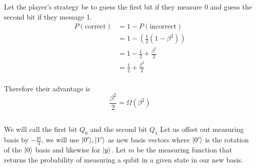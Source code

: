 Let the player's strategy be to guess the first bit if they measure 0 and guess the second bit if they message 1.
\begin{align*}
    P(\text{correct}) &= 1-P(\text{incorrect})\\
        &= 1-(\frac{1}{2}(1-\beta^2))\\
        &= 1-\frac{1}{2} + \frac{\beta^2}{2}\\
        &= \frac{1}{2} + \frac{\beta^2}{2}\\
\end{align*}

Therefore their advantage is 
\[\frac{\beta^2}{2} = \Omega(\beta^2)\]


\subsection{}
We will call the first bit $Q_0$ and the second bit $Q_1$
Let us offset out measuring basis by $-\frac{pi}{4}$, we will use $\lvert0'\rangle,\lvert1'\rangle$ as new basis vectors where $\lvert0'\rangle$ is the rotation of the $\lvert0\rangle$ basis and likewise for $\lvert y\rangle$.
Let $m$ be the measuring function that returns the probability of measuring a qubit in a given state in our new basis.


